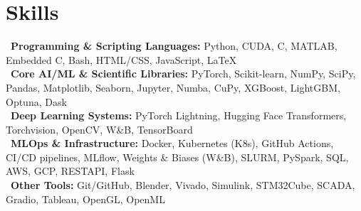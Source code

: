 \section*{Skills}
\textbullet~\textbf{Programming \& Scripting Languages:} Python, CUDA, C, MATLAB, Embedded C, Bash, HTML/CSS, JavaScript, \LaTeX \\[0.25em]
\textbullet~\textbf{Core AI/ML \& Scientific Libraries:} PyTorch, Scikit-learn, NumPy, SciPy, Pandas, Matplotlib, Seaborn, Jupyter, Numba, CuPy, XGBoost, LightGBM, Optuna, Dask \\[0.25em]
\textbullet~\textbf{Deep Learning Systems:} PyTorch Lightning, Hugging Face Transformers, Torchvision, OpenCV, W\&B, TensorBoard \\[0.25em]
\textbullet~\textbf{MLOps \& Infrastructure:} Docker, Kubernetes (K8s), GitHub Actions, CI/CD pipelines, MLflow, Weights \& Biases (W\&B), SLURM, PySpark, SQL, AWS, GCP, RESTAPI, Flask \\[0.25em]
\textbullet~\textbf{Other Tools:} Git/GitHub, Blender, Vivado, Simulink, STM32Cube, SCADA, Gradio, Tableau, OpenGL, OpenML